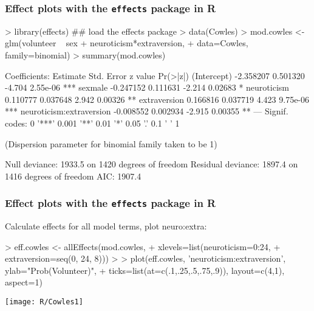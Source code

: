 \renewcommand{\FileName}{Cowles}
\begin{frame}[fragile]
  \frametitle{Effect plots with the \texttt{effects} package in R}
\begin{Rin}
> library(effects)  ## load the effects package 
> data(Cowles)
> mod.cowles <- glm(volunteer ~ sex + neuroticism*extraversion, 
+     data=Cowles, family=binomial)
> summary(mod.cowles)
\end{Rin}
\begin{Rout}[fontsize=\footnotesize,baselinestretch=0.9]
Coefficients:
                          Estimate Std. Error z value Pr(>|z|)    
(Intercept)              -2.358207   0.501320  -4.704 2.55e-06 ***
sexmale                  -0.247152   0.111631  -2.214  0.02683 *  
neuroticism               0.110777   0.037648   2.942  0.00326 ** 
extraversion              0.166816   0.037719   4.423 9.75e-06 ***
neuroticism:extraversion -0.008552   0.002934  -2.915  0.00355 ** 
---
Signif. codes:  0 '***' 0.001 '**' 0.01 '*' 0.05 '.' 0.1 ' ' 1 

(Dispersion parameter for binomial family taken to be 1)

    Null deviance: 1933.5  on 1420  degrees of freedom
Residual deviance: 1897.4  on 1416  degrees of freedom
AIC: 1907.4
\end{Rout}
\end{frame}

 
\begin{frame}[fragile]
  \frametitle{Effect plots with the \texttt{effects} package in R}
Calculate effects for all model terms, plot neuro:extra:
\begin{Rin}[fontsize=\footnotesize]
> eff.cowles <- allEffects(mod.cowles, 
+      xlevels=list(neuroticism=0:24, 
+                   extraversion=seq(0, 24, 8)))
> 
> plot(eff.cowles, 'neuroticism:extraversion', ylab="Prob(Volunteer)",
+     ticks=list(at=c(.1,.25,.5,.75,.9)), layout=c(4,1), aspect=1)
\end{Rin}
 \begin{center}
 \texttt{[image: R/Cowles1]}
 \end{center}

\end{frame}

\begin{comment}
> 
> plot(eff.cowles, 'neuroticism:extraversion', multiline=TRUE, 
+     ylab="Prob(Volunteer)")
\end{comment}
